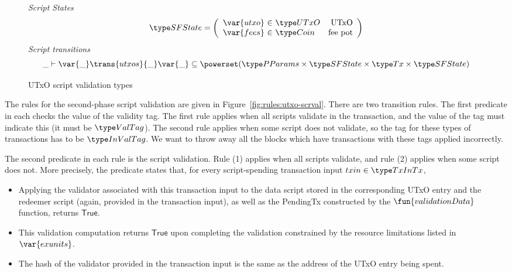 \begin{figure}[htb]
  \emph{Script States}
  \begin{equation*}
    \SFState =
    \left(
      \begin{array}{r@{~\in~}lr}
        \var{utxo} & \UTxO & \text{UTxO}\\
        \var{fees} & \Coin & \text{fee pot}\\
      \end{array}
    \right)
  \end{equation*}
  \emph{Script transitions}
  \begin{equation*}
    \_ \vdash
    \var{\_} \trans{utxos}{\_} \var{\_}
    \subseteq \powerset (\PParams \times \SFState \times \Tx \times \SFState)
  \end{equation*}
  \caption{UTxO script validation types}
  \label{fig:ts-types:utxo-scripts}
\end{figure}

The rules for the second-phase script validation are given in
Figure~\ref{fig:rules:utxo-scrval}. There are two transition rules.
The first predicate in each checks the value of the validity tag.
The first rule applies when all scripts validate in the transaction,
and the value of the tag must indicate this (it must be $\ValTag$).
The second rule applies when some script does not validate, so the
tag for these types of transactions has to be $\InValTag$. We want to
throw away all the blocks which have transactions with these tags
applied incorrectly.

The second predicate in each rule is the script validation.
Rule (1) applies when all scripts validate, and rule (2) applies when
some script does not.
More precisely, the predicate states that, for every script-spending
transaction input $txin \in \TxInTx$,

\begin{itemize}
\item Applying the validator associated with this transaction input
to the data script stored in the corresponding UTxO entry and the redeemer
script (again, provided in the transaction input), as well as the PendingTx
constructed by the $\fun{validationData}$ function, returns $\mathsf{True}$.
\item This validation computation returns $\mathsf{True}$ upon completing
the validation constrained by the resource limitations listed in $\var{exunits}$.
\item The hash of the validator provided in the transaction input is
the same as the address of the UTxO entry being spent.
\end{itemize}

